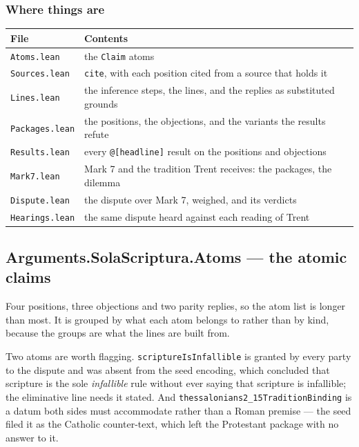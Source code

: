\documentclass[11pt]{article}
\begin{document}
\subsubsection*{Where things are}
\begin{longtable}{@{}>{\raggedright\arraybackslash}p{} >{\raggedright\arraybackslash}p{}@{}}
\toprule
\textbf{File} & \textbf{Contents} \\
\midrule
\endhead
\texttt{Atoms.lean} & the \texttt{Claim} atoms \\
\texttt{Sources.lean} & \texttt{cite}, with each position cited from a source that holds it \\
\texttt{Lines.lean} & the inference steps, the lines, and the replies as substituted grounds \\
\texttt{Packages.lean} & the positions, the objections, and the variants the results refute \\
\texttt{Results.lean} & every \texttt{@[headline]} result on the positions and objections \\
\texttt{Mark7.lean} & Mark 7 and the tradition Trent receives: the packages, the dilemma \\
\texttt{Dispute.lean} & the dispute over Mark 7, weighed, and its verdicts \\
\texttt{Hearings.lean} & the same dispute heard against each reading of Trent \\
\bottomrule
\end{longtable}
\subsection*{Arguments.SolaScriptura.Atoms — the atomic claims}
Four positions, three objections and two parity replies, so the atom list is longer than most. It is grouped by what each atom belongs to rather than by kind, because the groups are what the lines are built from.

Two atoms are worth flagging. \texttt{scripture\allowbreak{}Is\allowbreak{}Infallible} is granted by every party to the dispute and was absent from the seed encoding, which concluded that scripture is the sole \emph{infallible} rule without ever saying that scripture is infallible; the eliminative line needs it stated. And \texttt{thessalonians2\_\allowbreak{}15\allowbreak{}Tradition\allowbreak{}Binding} is a datum both sides must accommodate rather than a Roman premise — the seed filed it as the Catholic counter-text, which left the Protestant package with no answer to it.
\end{document}
